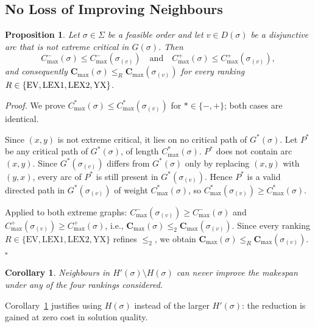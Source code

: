 \documentclass[preprint,12pt]{elsarticle}
\newtheorem{proposition}{Proposition}
\newtheorem{corollary}{Corollary}
\newenvironment{proof}%
  {\noindent\textit{Proof.}\enspace}%
  {\hfill$\square$\par\medskip}
\begin{document}
\subsection{No Loss of Improving Neighbours}
\label{sec4.2}

\begin{proposition}
\label{prop2}
Let $\sigma \in \Sigma$ be a feasible order and let $v \in D(\sigma)$ be a disjunctive arc that is \emph{not} extreme critical in $G(\sigma)$. Then
\begin{equation}
C^-_{\max}(\sigma) \leq C^-_{\max}(\sigma_{(v)}) \quad\text{and}\quad C^+_{\max}(\sigma) \leq C^+_{\max}(\sigma_{(v)}),
\end{equation}
and consequently $\mathbf{C}_{\max}(\sigma) \leq_{R} \mathbf{C}_{\max}(\sigma_{(v)})$ for every ranking $R \in \{{\rm EV}, {\rm LEX1}, {\rm LEX2}, {\rm YX}\}$.
\end{proposition}

\begin{proof}
We prove $C_{\max}^*(\sigma)\le C_{\max}^*(\sigma_{(v)})$ for $*\in\{-,+\}$; both cases are identical.

Since $(x,y)$ is not extreme critical, it lies on no critical path of $G^*(\sigma)$.
Let $P^*$ be any critical path of $G^*(\sigma)$, of length $C_{\max}^*(\sigma)$.
$P^*$ does not contain arc $(x,y)$.
Since $G^*(\sigma_{(v)})$ differs from $G^*(\sigma)$ only by replacing $(x,y)$ with $(y,x)$,
every arc of $P^*$ is still present in $G^*(\sigma_{(v)})$.
Hence $P^*$ is a valid directed path in $G^*(\sigma_{(v)})$ of weight $C_{\max}^*(\sigma)$,
so $C_{\max}^*(\sigma_{(v)})\ge C_{\max}^*(\sigma)$.

Applied to both extreme graphs: $C_{\max}^-(\sigma_{(v)})\ge C_{\max}^-(\sigma)$ and
$C_{\max}^+(\sigma_{(v)})\ge C_{\max}^+(\sigma)$,
i.e., $\mathbf{C}_{\max}(\sigma)\le_2\mathbf{C}_{\max}(\sigma_{(v)})$.
Since every ranking $R\in\{\mathrm{EV},\mathrm{LEX1},\mathrm{LEX2},\mathrm{YX}\}$ refines $\le_2$,
we obtain $\mathbf{C}_{\max}(\sigma)\le_R\mathbf{C}_{\max}(\sigma_{(v)})$.
\end{proof}

\medskip

\begin{corollary}
\label{cor1}
Neighbours in $H'(\sigma) \setminus H(\sigma)$ can never improve the makespan under any of the four rankings considered.
\end{corollary}

Corollary~\ref{cor1} justifies using $H(\sigma)$ instead of the larger $H'(\sigma)$: the reduction is gained at zero cost in solution quality.
\end{document}
